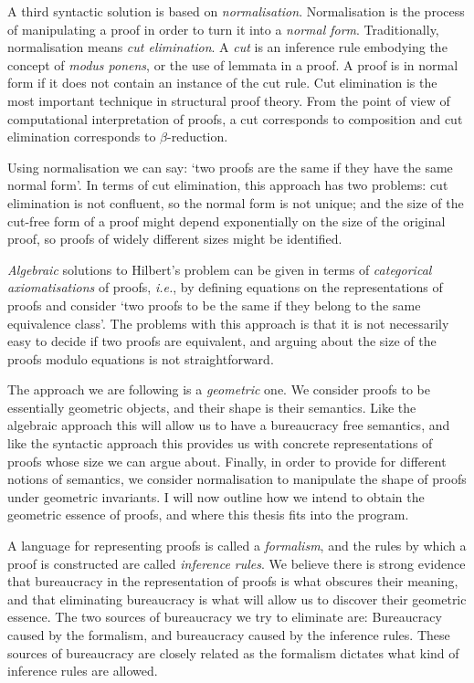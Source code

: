 A third syntactic solution is based on \emph{normalisation}. Normalisation is the process of manipulating a proof in order to turn it into a \emph{normal form}. Traditionally, normalisation means \emph{cut elimination}. A \emph{cut} is an inference rule embodying the concept of \emph{modus ponens}, or the use of lemmata in a proof. A proof is in normal form if it does not contain an instance of the cut rule. Cut elimination is the most important technique in structural proof theory. From the point of view of computational interpretation of proofs, a cut corresponds to composition and cut elimination corresponds to $\beta$-reduction.

Using normalisation we can say: `two proofs are the same if they have the same normal form'. In terms of cut elimination, this approach has two problems: cut elimination is not confluent, so the normal form is not unique; and the size of the cut-free form of a proof might depend exponentially  on the size of the original proof, so proofs of widely different sizes might be identified.


\emph{Algebraic} solutions to Hilbert's problem can be given in terms of \emph{categorical axiomatisations} of proofs, \emph{i.e.}, by defining equations on the representations of proofs and consider `two proofs to be the same if they belong to the same equivalence class'. The problems with this approach is that it is not necessarily easy to decide if two proofs are equivalent, and arguing about the size of the proofs modulo equations is not straightforward.


The approach we are following is a \emph{geometric} one. We consider proofs to be essentially geometric objects, and their shape is their semantics. Like the algebraic approach this will allow us to have a bureaucracy free semantics, and like the syntactic approach this provides us with concrete representations of proofs whose size we can argue about. Finally, in order to provide for different notions of semantics, we consider normalisation to manipulate the shape of proofs under geometric invariants. I will now outline how we intend to obtain the geometric essence of proofs, and where this thesis fits into the program.

A language for representing proofs is called a \emph{formalism}, and the rules by which a proof is constructed are called \emph{inference rules}. We believe there is strong evidence that bureaucracy in the representation of proofs is what obscures their meaning, and that eliminating bureaucracy is what will allow us to discover their geometric essence. The two sources of bureaucracy we try to eliminate are: Bureaucracy caused by the formalism, and bureaucracy caused by the inference rules. These sources of bureaucracy are closely related as the formalism dictates what kind of inference rules are allowed.

